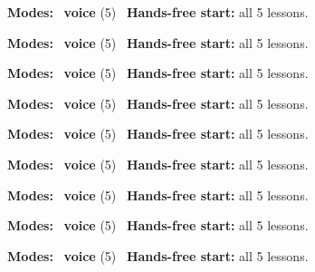 \expandafter\def\csname hlchaptermodality32\endcsname{%
  {\small\noindent
    \textbf{Modes:} \hlvoicesign{}~\textbf{voice} (5)\quad
    \hlvoicesign{}~\textbf{Hands-free start:} all 5 lessons.%
    \par}\medskip
}

\expandafter\def\csname hlchaptermodality33\endcsname{%
  {\small\noindent
    \textbf{Modes:} \hlvoicesign{}~\textbf{voice} (5)\quad
    \hlvoicesign{}~\textbf{Hands-free start:} all 5 lessons.%
    \par}\medskip
}

\expandafter\def\csname hlchaptermodality34\endcsname{%
  {\small\noindent
    \textbf{Modes:} \hlvoicesign{}~\textbf{voice} (5)\quad
    \hlvoicesign{}~\textbf{Hands-free start:} all 5 lessons.%
    \par}\medskip
}

\expandafter\def\csname hlchaptermodality35\endcsname{%
  {\small\noindent
    \textbf{Modes:} \hlvoicesign{}~\textbf{voice} (5)\quad
    \hlvoicesign{}~\textbf{Hands-free start:} all 5 lessons.%
    \par}\medskip
}

\expandafter\def\csname hlchaptermodality36\endcsname{%
  {\small\noindent
    \textbf{Modes:} \hlvoicesign{}~\textbf{voice} (5)\quad
    \hlvoicesign{}~\textbf{Hands-free start:} all 5 lessons.%
    \par}\medskip
}

\expandafter\def\csname hlchaptermodality37\endcsname{%
  {\small\noindent
    \textbf{Modes:} \hlvoicesign{}~\textbf{voice} (5)\quad
    \hlvoicesign{}~\textbf{Hands-free start:} all 5 lessons.%
    \par}\medskip
}

\expandafter\def\csname hlchaptermodality38\endcsname{%
  {\small\noindent
    \textbf{Modes:} \hlvoicesign{}~\textbf{voice} (5)\quad
    \hlvoicesign{}~\textbf{Hands-free start:} all 5 lessons.%
    \par}\medskip
}

\expandafter\def\csname hlchaptermodality39\endcsname{%
  {\small\noindent
    \textbf{Modes:} \hlvoicesign{}~\textbf{voice} (5)\quad
    \hlvoicesign{}~\textbf{Hands-free start:} all 5 lessons.%
    \par}\medskip
}

\expandafter\def\csname hlchaptermodality40\endcsname{%
  {\small\noindent
    \textbf{Modes:} \hlvoicesign{}~\textbf{voice} (5)\quad
    \hlvoicesign{}~\textbf{Hands-free start:} all 5 lessons.%
    \par}\medskip
}

